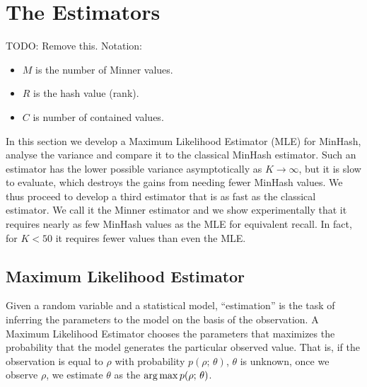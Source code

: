 
\section{The Estimators}

TODO: Remove this.
Notation:
\begin{itemize}
   \item $M$ is the number of Minner values.
   \item $R$ is the hash value (rank).
   \item $C$ is number of contained values.
\end{itemize}

\hspace{1em}

In this section we develop a Maximum Likelihood Estimator (MLE) for MinHash, analyse the variance and compare it to the classical MinHash estimator.
Such an estimator has the lower possible variance asymptotically as $K\to\infty$, but it is slow to evaluate, which destroys the gains from needing fewer MinHash values.
We thus proceed to develop a third estimator that is as fast as the classical estimator.
We call it the Minner estimator and we show experimentally that it requires nearly as few MinHash values as the MLE for equivalent recall.
In fact, for $K < 50$ it requires fewer values than even the MLE.

\subsection{Maximum Likelihood Estimator}

Given a random variable and a statistical model, ``estimation'' is the task of inferring the parameters to the model on the basis of the observation.
A Maximum Likelihood Estimator chooses the parameters that maximizes the probability that the model generates the particular observed value.
That is, if the observation is equal to $\rho$ with probability $p(\rho;\,\theta)$, $\theta$ is unknown, once we observe $\rho$, we estimate $\theta$ as the $\operatorname*{arg\,max} p(\rho;\,\theta)$.


